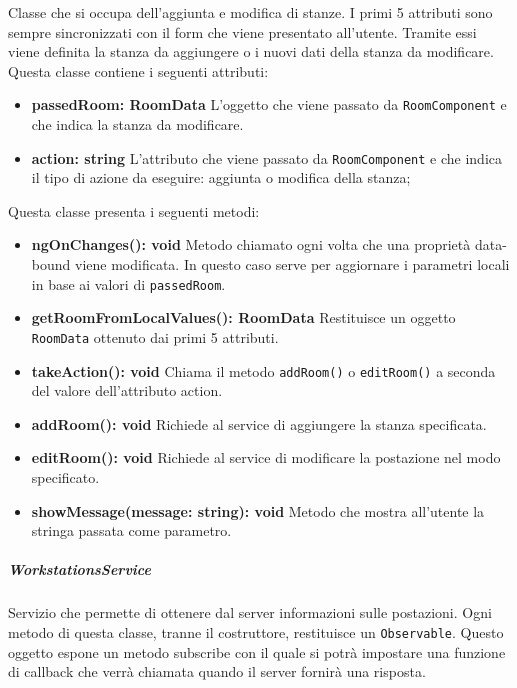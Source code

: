Classe che si occupa dell'aggiunta e modifica di stanze. I primi 5 attributi sono sempre sincronizzati con il form che viene presentato all'utente. Tramite essi viene definita la stanza da aggiungere o i nuovi dati della stanza da modificare.\newline
Questa classe contiene i seguenti attributi:
\begin{itemize}
	\item \textbf{passedRoom: RoomData 	} \newline
	L'oggetto che viene passato da \texttt{RoomComponent} e che indica la stanza da modificare.
	\item \textbf{action: string} \newline
	L'attributo che viene passato da \texttt{RoomComponent} e che indica il tipo di azione da eseguire: aggiunta o modifica della stanza;
\end{itemize}
Questa classe presenta i seguenti metodi:
\begin{itemize}
	\item \textbf{ngOnChanges(): void 	} \newline
	Metodo chiamato ogni volta che una proprietà data-bound viene modificata. In questo caso serve per aggiornare i parametri locali in base ai valori di \texttt{passedRoom}.
	\item \textbf{getRoomFromLocalValues(): RoomData 	} \newline
	Restituisce un oggetto \texttt{RoomData} ottenuto dai primi 5 attributi.
	\item \textbf{takeAction(): void 	} \newline
	Chiama il metodo \texttt{addRoom()} o \texttt{editRoom()} a seconda del valore dell'attributo action.
	\item \textbf{addRoom(): void 	} \newline
	Richiede al service di aggiungere la stanza specificata.
	\item \textbf{editRoom(): void} \newline
	Richiede al service di modificare la postazione nel modo specificato.
	\item \textbf{showMessage(message: string): void} \newline
	Metodo che mostra all'utente la stringa passata come parametro.
\end{itemize}
\subparagraph{WorkstationsService}
Servizio che permette di ottenere dal server informazioni sulle postazioni. Ogni metodo di questa classe, tranne il costruttore, restituisce un \texttt{Observable}. Questo oggetto espone un metodo subscribe con il quale si potrà impostare una funzione di callback che verrà chiamata quando il server fornirà una risposta. \newline
